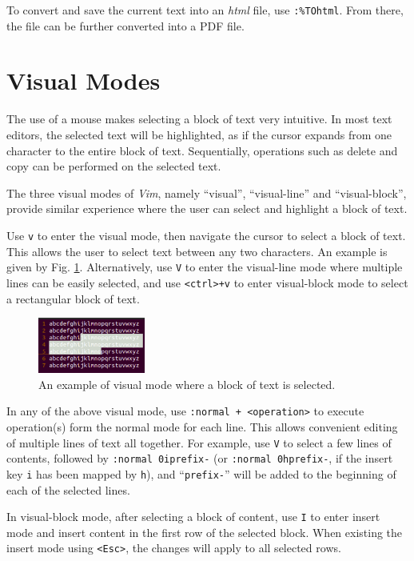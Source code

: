To convert and save the current text into an \textit{html} file, use \verb|:%TOhtml|. From there, the file can be further converted into a PDF file.

\section{Visual Modes}

The use of a mouse makes selecting a block of text very intuitive. In most text editors, the selected text will be highlighted, as if the cursor expands from one character to the entire block of text. Sequentially, operations such as delete and copy can be performed on the selected text.

The three visual modes of \textit{Vim}, namely ``visual'', ``visual-line'' and ``visual-block'', provide similar experience where the user can select and highlight a block of text.

Use \verb|v| to enter the visual mode, then navigate the cursor to select a block of text. This allows the user to select text between any two characters. An example is given by Fig. \ref{ch:tfe:fig:vimvm1}. Alternatively, use \verb|V| to enter the visual-line mode where multiple lines can be easily selected, and use \verb|<ctrl>+v| to enter visual-block mode to select a rectangular block of text.

\begin{figure}[htbp]
	\centering
	\includegraphics[width=100pt]{chapters/part-1/figures/vimvm1.png}
	\caption{An example of visual mode where a block of text is selected.} \label{ch:tfe:fig:vimvm1}
\end{figure}

In any of the above visual mode, use \verb|:normal + <operation>| to execute operation(s) form the normal mode for each line. This allows convenient editing of multiple lines of text all together. For example, use \verb|V| to select a few lines of contents, followed by \verb|:normal 0iprefix-| (or \verb|:normal 0hprefix-|, if the insert key \verb|i| has been mapped by \verb|h|), and ``\verb|prefix-|'' will be added to the beginning of each of the selected lines.

In visual-block mode, after selecting a block of content, use \verb|I| to enter insert mode and insert content in the first row of the selected block. When existing the insert mode using \verb|<Esc>|, the changes will apply to all selected rows.


